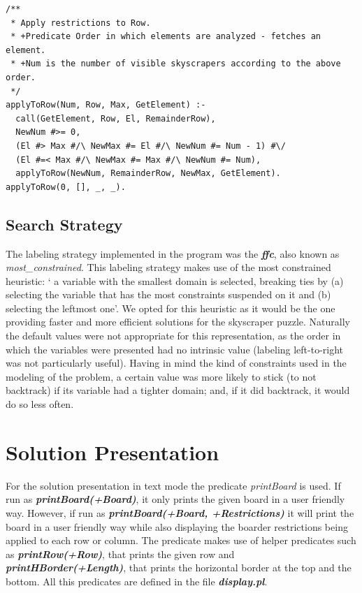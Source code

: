 \documentclass{llncs}
\begin{document}
\begin{lstlisting}[frame=tblr, caption=Constraint that assures correct number of visible buildings ]	
/**
 * Apply restrictions to Row.
 * +Predicate Order in which elements are analyzed - fetches an element.
 * +Num is the number of visible skyscrapers according to the above order.
 */
applyToRow(Num, Row, Max, GetElement) :-
  call(GetElement, Row, El, RemainderRow),
  NewNum #>= 0,
  (El #> Max #/\ NewMax #= El #/\ NewNum #= Num - 1) #\/
  (El #=< Max #/\ NewMax #= Max #/\ NewNum #= Num),
  applyToRow(NewNum, RemainderRow, NewMax, GetElement).
applyToRow(0, [], _, _).
\end{lstlisting}

%
\subsection{Search Strategy}

The labeling strategy implemented in the program was the \textbf{\textit{ffc}}, also known as \textit{most\_constrained}. This labeling strategy makes use of the most constrained heuristic: ` a variable with the smallest domain is selected, breaking ties by (a) selecting the variable that has the most constraints suspended on it and (b) selecting the leftmost one'\cite{carlsson_fruhwirth_2016}.  We opted for this heuristic as it would be the one providing faster and more efficient solutions for the skyscraper puzzle. Naturally the default values were not appropriate for this representation, as the order in which the variables were presented had no intrinsic value (labeling left-to-right was not particularly useful). Having in mind the kind of constraints used in the modeling of the problem, a certain value was more likely to stick (to not backtrack) if its variable had a tighter domain; and, if it did backtrack, it would do so less often.

%
\section{Solution Presentation}

For the solution presentation in text mode the predicate \textit{printBoard} is used. If run as \textbf{\textit{printBoard(+Board)}}, it only prints the given board in a user friendly way. However, if run as \textbf{\textit{printBoard(+Board, +Restrictions)}} it will print the board in a user friendly way while also displaying the boarder restrictions being applied to each row or column. The predicate makes use of helper predicates such as \textbf{\textit{printRow(+Row)}}, that prints the given row and \textbf{\textit{printHBorder(+Length)}}, that prints the horizontal border at the top and the bottom. All this predicates are defined in the file \textbf{\textit{display.pl}}.
\end{document}
